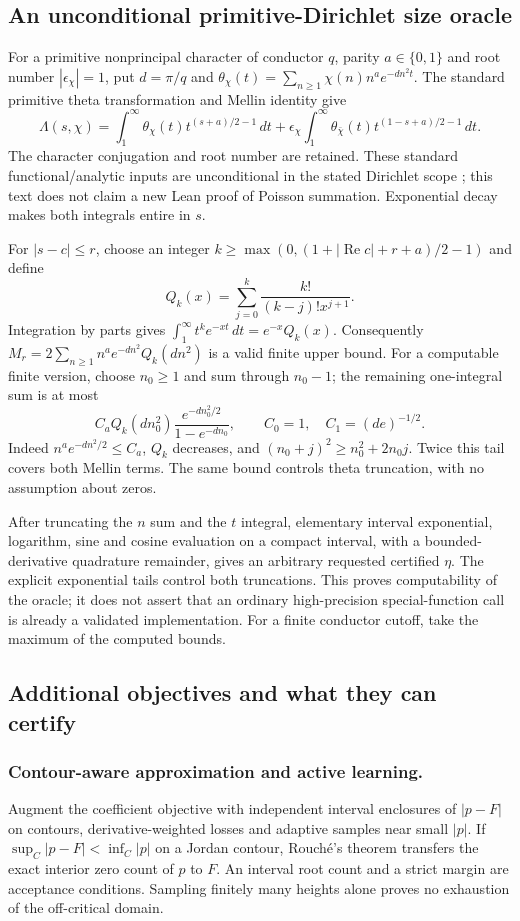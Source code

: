 \documentclass[11pt,oneside,openany]{book}
\theoremstyle{definition}\newtheorem{definition}[theorem]{Definition}
\theoremstyle{remark}\newtheorem{remark}[theorem]{Remark}
\begin{document}
\subsection{An unconditional primitive-Dirichlet size oracle}
For a primitive nonprincipal character of conductor $q$, parity $a\in\{0,1\}$
and root number $|\epsilon_\chi|=1$, put $d=\pi/q$ and
$\theta_\chi(t)=\sum_{n\ge1}\chi(n)n^a e^{-dn^2t}$.
The standard primitive theta transformation and Mellin identity give
\[
 \Lambda(s,\chi)=\int_1^\infty\theta_\chi(t)t^{(s+a)/2-1}\,dt
 +\epsilon_\chi\int_1^\infty\theta_{\bar\chi}(t)t^{(1-s+a)/2-1}\,dt.
\]
The character conjugation and root number are retained. These standard
functional/analytic inputs are unconditional in the stated Dirichlet scope
\cite{HLDirichlet}; this text does not claim a new Lean proof of Poisson
summation. Exponential decay makes both integrals entire in $s$.

For $|s-c|\le r$, choose an integer
$k\ge\max(0,(1+|\operatorname{Re}c|+r+a)/2-1)$ and define
\[
 Q_k(x)=\sum_{j=0}^k\frac{k!}{(k-j)!x^{j+1}}.
\]
Integration by parts gives
$\int_1^\infty t^ke^{-xt}\,dt=e^{-x}Q_k(x)$.
Consequently $M_r=2\sum_{n\ge1}n^ae^{-dn^2}Q_k(dn^2)$ is a valid
finite upper bound. For a computable finite version, choose $n_0\ge1$ and sum through $n_0-1$;
the remaining one-integral sum is at most
\[
 C_a Q_k(dn_0^2)
 \frac{e^{-dn_0^2/2}}{1-e^{-dn_0}},\qquad
 C_0=1,\quad C_1=(de)^{-1/2}.
\]
Indeed $n^ae^{-dn^2/2}\le C_a$, $Q_k$ decreases, and
$(n_0+j)^2\ge n_0^2+2n_0j$. Twice this tail covers both Mellin terms.
The same bound controls theta truncation, with no assumption about zeros.

After truncating the $n$ sum and the $t$ integral, elementary interval
exponential, logarithm, sine and cosine evaluation on a compact interval,
with a bounded-derivative quadrature remainder, gives an arbitrary requested
certified $\eta$. The explicit exponential tails control both truncations.
This proves computability of the oracle; it does not assert that an ordinary
high-precision special-function call is already a validated implementation.
For a finite conductor cutoff, take the maximum of the computed bounds.

\subsection{Additional objectives and what they can certify}
\subsubsection{Contour-aware approximation and active learning.}
Augment the coefficient objective with independent interval enclosures of
$|p-F|$ on contours, derivative-weighted losses and adaptive samples near
small $|p|$. If $\sup_C|p-F|<\inf_C|p|$ on a Jordan contour, Rouch\'e's
theorem transfers the exact interior zero count of $p$ to $F$. An interval
root count and a strict margin are acceptance conditions. Sampling finitely
many heights alone proves no exhaustion of the off-critical domain.
\end{document}
